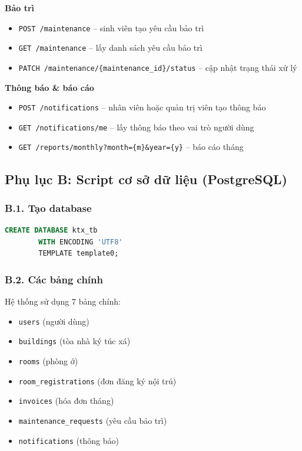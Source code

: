 \documentclass[13pt,a4paper]{extarticle}
\numberwithin{figure}{section}
\numberwithin{table}{section}
\begin{document}
	\noindent
	\textbf{Bảo trì}
	\begin{itemize}
		\item \texttt{POST /maintenance} -- sinh viên tạo yêu cầu bảo trì
		\item \texttt{GET /maintenance} -- lấy danh sách yêu cầu bảo trì
		\item \texttt{PATCH /maintenance/\{maintenance\_id\}/status} -- cập nhật trạng thái xử lý
	\end{itemize}
	
	\noindent
	\textbf{Thông báo \& báo cáo}
	\begin{itemize}
		\item \texttt{POST /notifications} -- nhân viên hoặc quản trị viên tạo thông báo
		\item \texttt{GET /notifications/me} -- lấy thông báo theo vai trò người dùng
		\item \texttt{GET /reports/monthly?month=\{m\}\&year=\{y\}} -- báo cáo tháng
	\end{itemize}
	
	\subsection*{Phụ lục B: Script cơ sở dữ liệu (PostgreSQL)}
	
	\subsubsection*{B.1. Tạo database}
	
	\begin{lstlisting}[language=SQL]
		CREATE DATABASE ktx_tb
		WITH ENCODING 'UTF8'
		TEMPLATE template0;
	\end{lstlisting}
	
	\subsubsection*{B.2. Các bảng chính}
	
	\noindent
	Hệ thống sử dụng 7 bảng chính:
	\begin{itemize}
		\item \texttt{users} (người dùng)
		\item \texttt{buildings} (tòa nhà ký túc xá)
		\item \texttt{rooms} (phòng ở)
		\item \texttt{room\_registrations} (đơn đăng ký nội trú)
		\item \texttt{invoices} (hóa đơn tháng)
		\item \texttt{maintenance\_requests} (yêu cầu bảo trì)
		\item \texttt{notifications} (thông báo)
	\end{itemize}
	
\end{document}
